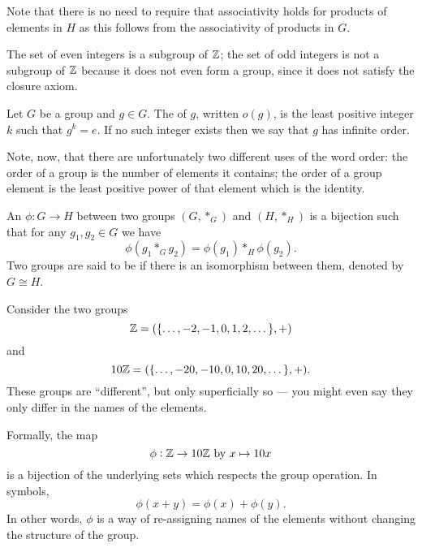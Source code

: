 \begin{remark}
Note that there is no need to require that associativity holds for products of elements in $H$ as this follows from the associativity of products in $G$.
\end{remark}

\begin{example}
The set of even integers is a subgroup of $\mathbb Z$; the set of odd integers is not a subgroup of $\mathbb Z$ because it does not even form a group, since it does not satisfy the closure axiom.
\end{example}

\begin{definition}
Let $G$ be a group and $g \in G$. The  of $g$, written $o(g)$, is the least positive integer $k$ such that $g^k=e$. If no such integer exists then we say that $g$ has infinite order.
\end{definition}

\begin{remark}
Note, now, that there are unfortunately two different uses of the word order: the order of a group is the number of elements it contains; the order of a group element is the least positive power of that element which is the identity.
\end{remark}

\begin{definition}[Isomorphism]
An  $\phi: G \to H$ between two groups $(G,\ast_G)$ and $(H,\ast_H)$ is a bijection such that for any $g_1,g_2 \in G$ we have
\[ \phi(g_1 \ast_G g_2) = \phi(g_1) \ast_H \phi(g_2). \]
Two groups are said to be  if there is an isomorphism between them, denoted by $G \cong H$.
\end{definition}

\begin{example}[$\ZZ\cong10\ZZ$]
Consider the two groups
\[ \mathbb Z = (\{\dots, -2, -1, 0, 1, 2, \dots\}, +) \] and
\[ 10\mathbb Z = (\{\dots, -20, -10, 0, 10, 20, \dots\}, +). \]
These groups are ``different'', but only superficially so --- you might even say they only differ in the names of the elements.

Formally, the map
\[ \phi: \mathbb Z \to 10\mathbb Z \text{ by } x \mapsto 10x \]
is a bijection of the underlying sets which respects the group operation. In symbols,
\[ \phi(x+y) = \phi(x) + \phi(y). \]
In other words, $\phi$ is a way of re-assigning names of the elements without changing the structure of the group.
\end{example}
\pagebreak

